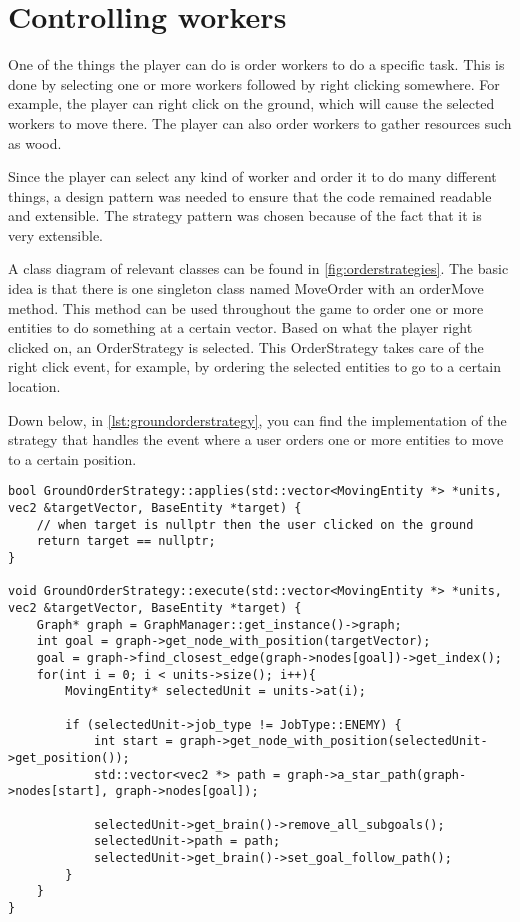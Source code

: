 \section{Controlling workers}

One of the things the player can do is order workers to do a specific task.
This is done by selecting one or more workers followed by right clicking
somewhere. For example, the player can right click on the ground, which will
cause the selected workers to move there. The player can also order workers
to gather resources such as wood.

Since the player can select any kind of worker and order it to do many
different things, a design pattern was needed to ensure that the code
remained readable and extensible. The strategy pattern was chosen because of
the fact that it is very extensible.

A class diagram of relevant classes can be found in
\cref{fig:orderstrategies}. The basic idea is that there is one singleton
class named MoveOrder with an orderMove method. This method can be used
throughout the game to order one or more entities to do something at a
certain vector. Based on what the player right clicked on, an OrderStrategy
is selected. This OrderStrategy takes care of the right click event, for
example, by ordering the selected entities to go to a certain location.

Down below, in \cref{lst:groundorderstrategy}, you can find the implementation 
of the strategy that handles the event where a user orders one or more entities
to move to a certain position.
\\
\begin{lstlisting}[caption={GroundOrderStrategy implementation.},
label={lst:groundorderstrategy}]
bool GroundOrderStrategy::applies(std::vector<MovingEntity *> *units, vec2 &targetVector, BaseEntity *target) {
    // when target is nullptr then the user clicked on the ground
    return target == nullptr;
}

void GroundOrderStrategy::execute(std::vector<MovingEntity *> *units, vec2 &targetVector, BaseEntity *target) {
    Graph* graph = GraphManager::get_instance()->graph;
    int goal = graph->get_node_with_position(targetVector);
    goal = graph->find_closest_edge(graph->nodes[goal])->get_index();
    for(int i = 0; i < units->size(); i++){
        MovingEntity* selectedUnit = units->at(i);

        if (selectedUnit->job_type != JobType::ENEMY) {
            int start = graph->get_node_with_position(selectedUnit->get_position());
            std::vector<vec2 *> path = graph->a_star_path(graph->nodes[start], graph->nodes[goal]);

            selectedUnit->get_brain()->remove_all_subgoals();
            selectedUnit->path = path;
            selectedUnit->get_brain()->set_goal_follow_path();
        }
    }
}
\end{lstlisting}
